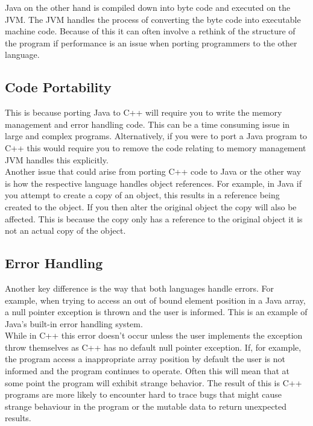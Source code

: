 \documentclass[11pt]{article}  %
\theoremstyle{definition}
\theoremstyle{remark}
\begin{document}
Java on the other hand is compiled down into byte code and executed on the JVM. The JVM handles the process of converting the byte code into executable machine code. Because of this it can often involve a rethink of the structure of the program if performance is an issue when porting programmers to the other language. \\

\subsection{Code Portability}\label{ss:back}

This is because porting Java to C++ will require you to write the memory management and error handling code. This can be a time consuming issue in large and complex programs. Alternatively, if you were to port a Java program to C++ this would require you to remove the code relating to memory management JVM handles this explicitly.\\

Another issue that could arise from porting C++ code to Java or the other way is how the respective language handles object references. For example, in Java if you attempt to create a copy of an object, this results in a reference being created to the object. If you then alter the original object the copy will also be affected. This is because the copy only has a reference to the original object it is not an actual copy of the object.  \\

\subsection{Error Handling}\label{ss:back}

Another key difference is the way that both languages handle errors. For example, when trying to access an out of bound element position in a Java array, a null pointer exception is thrown and the user is informed. This is an example of Java's built-in error handling system.\\

While in C++ this error doesn't occur unless the user implements the exception throw themselves as C++ has no default null pointer exception. If, for example, the program access a inappropriate array position by default the user is not informed and the program continues to operate. Often this will mean that at some point the program will exhibit strange behavior.  The result of this is C++ programs are more likely to encounter hard to trace bugs that might cause strange behaviour in the program or the mutable data to return unexpected results.\\
\end{document}
